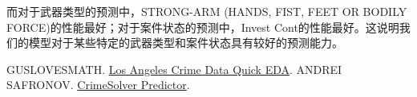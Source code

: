 \documentclass{article}
\begin{document}
而对于武器类型的预测中，STRONG-ARM (HANDS, FIST, FEET OR BODILY FORCE)的性能最好；对于案件状态的预测中，Invest Cont的性能最好。这说明我们的模型对于某些特定的武器类型和案件状态具有较好的预测能力。

\begin{thebibliography}{99}
     GUSLOVESMATH. \href{https://www.kaggle.com/code/guslovesmath/los-angeles-crime-data-quick-eda}{Los Angeles Crime Data Quick EDA}.
     ANDREI SAFRONOV. \href{https://www.kaggle.com/code/safronov00/crimesolver-predictor#2.-Clean-Data}{CrimeSolver Predictor}.
\end{thebibliography}
\end{document}
